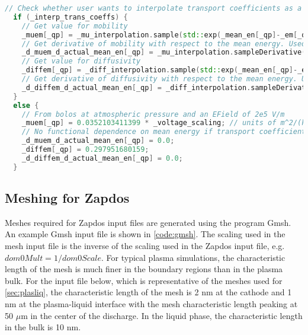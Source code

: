 \begin{lstlisting}[language=C++, caption = Material property definition, label = code:mat_def]
  // Check whether user wants to interpolate transport coefficients as a function of mean energy, or just use constants
  if (_interp_trans_coeffs) {
    // Get value for mobility
    _muem[_qp] = _mu_interpolation.sample(std::exp(_mean_en[_qp]-_em[_qp])) * _voltage_scaling;
    // Get derivative of mobility with respect to the mean energy. Used in Jacobian computations
    _d_muem_d_actual_mean_en[_qp] = _mu_interpolation.sampleDerivative(std::exp(_mean_en[_qp]-_em[_qp])) * _voltage_scaling;
    // Get value for diffusivity
    _diffem[_qp] = _diff_interpolation.sample(std::exp(_mean_en[_qp]-_em[_qp]));
    // Get derivative of diffusivity with respect to the mean energy. Used in Jacobian computations
    _d_diffem_d_actual_mean_en[_qp] = _diff_interpolation.sampleDerivative(std::exp(_mean_en[_qp]-_em[_qp]));
  }
  else {
    // From bolos at atmospheric pressure and an EField of 2e5 V/m
    _muem[_qp] = 0.0352103411399 * _voltage_scaling; // units of m^2/(kV*s) if _voltage_scaling = 1000
    // No functional dependence on mean energy if transport coefficients are constant
    _d_muem_d_actual_mean_en[_qp] = 0.0;
    _diffem[_qp] = 0.297951680159;
    _d_diffem_d_actual_mean_en[_qp] = 0.0;
  }
\end{lstlisting}


\subsection{Meshing for Zapdos}
\label{sec:zap_meshing}

Meshes required for Zapdos input files are generated using the program Gmsh. \cite{geuzaine2009gmsh} An example Gmsh input file is shown in \cref{code:gmsh}. The scaling used in the mesh input file is the inverse of the scaling used in the Zapdos input file, e.g. $dom0Mult = 1/dom0Scale$. For typical plasma simulations, the characteristic length of the mesh is much finer in the boundary regions than in the plasma bulk. For the input file below, which is representative of the meshes used for \cref{sec:plasliq}, the characteristic length of the mesh is 2 nm at the cathode and 1 nm at the plasma-liquid interface with the mesh characteristic length peaking at 50 $\mu$m in the center of the discharge. In the liquid phase, the characteristic length in the bulk is 10 nm.

